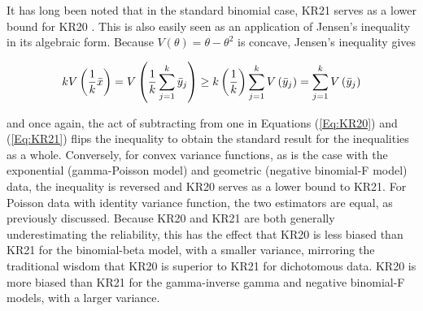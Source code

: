 \documentclass[12pt,epsfig]{article}
\newcommand{\changed}[1]{\textcolor{black}{#1}}
\newcommand{\numsubjects}{\changed{n}}%
\newcommand{\testlength}{\changed{k}}%
\begin{document}
It has long been noted that in the standard binomial case, KR21 serves as a lower bound for KR20 \citep{Kuder1937}. This is also easily seen as an application of Jensen's inequality in its algebraic form. Because $V(\theta) = \theta - \theta^2$ is concave, Jensen's inequality gives

\begin{equation*}
\testlength V\left( \frac{1}{\testlength} \bar{x}\right) = V\left(\frac{1}{\testlength} \sum_{j = 1}^{\testlength} \bar{y}_j\right) \ge \testlength \left(\frac{1}{\testlength} \right)\sum_{j = 1}^{\testlength}  V\left(\bar{y}_j\right) = \sum_{j = 1}^{\testlength}  V\left(\bar{y}_j\right)
\end{equation*}

\noindent and once again, the act of subtracting from one in Equations (\ref{Eq:KR20}) and (\ref{Eq:KR21}) flips the inequality to obtain the standard result for the inequalities as a whole. Conversely, for convex variance functions, as is the case with the exponential (gamma-Poisson model) and geometric (negative binomial-F model) data, the inequality is reversed and KR20 serves as a lower bound to KR21. For Poisson data with identity variance function, the two estimators are equal, as previously discussed. Because KR20 and KR21 are both generally underestimating the reliability, this has the effect that KR20 is less biased than KR21 for the binomial-beta model, with a smaller variance, mirroring the traditional wisdom that KR20 is superior to KR21 for dichotomous data. KR20 is more biased than KR21 for the gamma-inverse gamma and negative binomial-F models, with a larger variance.



\end{document}
